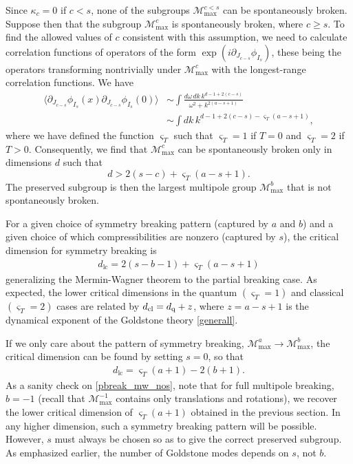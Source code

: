 \documentclass[prb,aps,twocolumn, amsfonts,amsmath,amssymb,nofootinbib,superscriptaddress]{revtex4-2}
\renewcommand{\max}{\text{max}}
\newcommand{\mmax}[1]{\mathcal{M}^{#1}_\max}
\newcommand\be            {\begin{equation}}
\newcommand\ee            {\end{equation}}
\newcommand\ba            {\begin{aligned}}
\newcommand\ea            {\end{aligned}}
\newcommand{\p}{\partial}
\begin{document}
Since $\kappa_c=0$ if $c<s$, none of the subgroups $\mmax {c<s}$ can be spontaneously broken. Suppose then that the subgroup $\mmax{c}$ is spontaneously broken, where $c\geq s$. To find the allowed values of $c$ consistent with this assumption, we need to calculate correlation functions of operators of the form $\exp(i\p_{J_{c-s}}\phi_{I_s})$, these being the operators transforming nontrivially under $\mmax c$ with the longest-range correlation functions. We have 
\be\ba \langle \p_{J_{c-s}}\phi_{I_s}(x) \p_{J_{c-s}}\phi_{I_s}(0)\rangle & \sim \int \frac{d\omega \, dk\, k^{d-1+2(c-s)}}{\omega^2 + k^{2(a-s+1)}} \\ 
& \sim \int dk\, k^{d-1+2(c-s) - \varsigma_T(a-s+1)}, \ea\ee 
where we have defined the function $\varsigma_T$ such that $\varsigma_T = 1$ if $T=0$ and $\varsigma_T = 2$ if $T>0$. Consequently, we find that $\mmax c$ can be spontaneously broken only in dimensions $d$ such that 
\be d>2(s-c) + \varsigma_T(a-s+1).\ee 
The preserved subgroup is then the largest multipole group $\mmax{b}$ that is not spontaneously broken.

For a given choice of symmetry breaking pattern (captured by $a$ and $b$) and a given choice of which compressibilities are nonzero (captured by $s$), the critical dimension for symmetry breaking is
\begin{align}
d_\text{lc} = 2(s - b-1) + \varsigma_T (a-s+1) \label{pbreak_mw} 
\end{align}
generalizing the Mermin-Wagner theorem to the partial breaking case. 
As expected, the lower critical dimensions in the quantum $(\varsigma_T = 1)$ and classical $(\varsigma_T = 2)$ cases are related by $d_{\rm cl} = d_{\rm q} + z$, where $z=a-s+1$ is the dynamical exponent of the Goldstone theory \eqref{generall}. 

If we only care about the pattern of symmetry breaking, $\mmax{a}\rightarrow \mmax{b}$, the critical dimension can be found by setting $s=0$, so that
\begin{align}
d_\text{lc} = \varsigma_T (a+1) -2 (b+1). \label{pbreak_mw_nos}
\end{align}
As a sanity check on \eqref{pbreak_mw_nos}, note that for full multipole breaking, $b=-1$ (recall that $\mmax{-1}$ contains only translations and rotations), we recover the lower critical dimension of $\varsigma_T(a+1)$ obtained in the previous section. 
In any higher dimension, such a symmetry breaking pattern will be possible. However, $s$ must always be chosen so as to give the correct preserved subgroup. As emphasized earlier, the number of Goldstone modes depends on $s$, not $b$.
\end{document}
